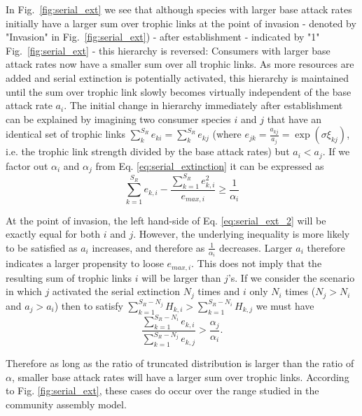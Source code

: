 \documentclass[a4paper]{report}
\begin{document}
In Fig.~\ref{fig:serial_ext} we see that although species with larger base attack rates initially have a larger sum over trophic links at the point of invasion - denoted by "Invasion" in Fig.~\ref{fig:serial_ext}) - after establishment - indicated by "1" Fig.~\ref{fig:serial_ext} - this hierarchy is reversed: Consumers with larger base attack rates now have a smaller sum over all trophic links. As more resources are added and serial extinction is potentially activated, this hierarchy is maintained until the sum over trophic link slowly becomes virtually independent of the base attack rate $a_i$. The initial change in hierarchy immediately after establishment can be explained by imagining two consumer species $i$ and $j$ that have an identical set of trophic links $\sum_k^{S_R}e_{ki}=\sum_k^{S_R}e_{kj}$ (where $e_{jk}=\frac{a_{kj}}{a_j}=\exp(\sigma \xi_{kj})$, i.e. the trophic link strength divided by the base attack rates) but $a_i<a_j$. If we factor out $\alpha_i$ and $\alpha_j$ from Eq. \eqref{eq:serial_extinction} it can be expressed as 
\begin{equation}
\sum_{k=1}^{S_{R}}e_{k,i}-\frac{\sum_{k=1}^{S_{R}}e_{k,i}^{2}}{e_{max,i}}\geq \frac{1}{\alpha_i}\label{eq:serial_ext_2}
\end{equation}

At the point of invasion, the left hand-side of Eq. \eqref{eq:serial_ext_2} will be exactly equal for both $i$ and $j$. However, the underlying inequality is more likely to be satisfied as $a_i$ increases, and therefore as $\frac{1}{\alpha_i}$ decreases. Larger $a_i$ therefore indicates a larger propensity to loose $e_{max,i}$. This does not imply that the resulting sum of trophic links $i$ will be larger than $j$'s. If we consider the scenario in which $j$ activated the serial extinction $N_j$ times and $i$ only $N_i$ times ($N_j>N_i$ and $a_j>a_i$) then to satisfy $\sum_{k=1}^{S_{R}-N_j}H_{k,i}>\sum_{k=1}^{S_{R}-N_i}H_{k,j}$ we must have
\begin{equation}
 \frac{\sum_{k=1}^{S_{R}-N_i}e_{k,i}}{\sum_{k=1}^{S_{R}-N_j}e_{k,j}} > \frac{\alpha_j}{\alpha_i}. \label{eq:serial_ext_3}
\end{equation}

Therefore as long as the ratio of truncated distribution is larger than the ratio of $\alpha$, smaller base attack rates will have a larger sum over trophic links. According to Fig. \ref{fig:serial_ext}, these cases do occur over the range studied in the community assembly model. \\
\end{document}
